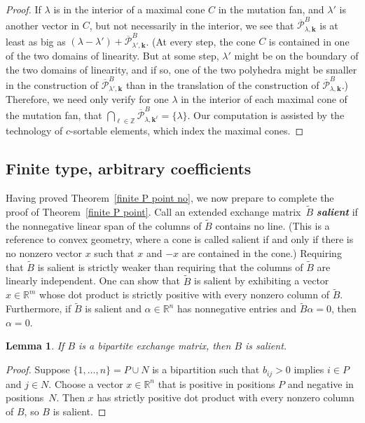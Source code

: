 \documentclass[10pt]{article}
\newtheorem{lemma}[proposition]{Lemma}
\theoremstyle{definition}
\theoremstyle{remark}
\numberwithin{equation}{section}
\newcommand{\newword}[1]{\textbf{\emph{#1}}}
\newcommand{\integers}{\mathbb Z}
\newcommand{\reals}{\mathbb R}
\newcommand{\set}[1]{{\lbrace #1 \rbrace}}
\newcommand{\0}{{\mathbf{0}}}
\newcommand{\kk}{{\boldsymbol{k}}}
\newcommand{\tB}{{\widetilde{B}}}
\renewcommand{\P}{\mathcal{P}}
\begin{document}
\begin{proof}
If $\lambda$ is in the interior of a maximal cone $C$ in the mutation fan, and $\lambda'$ is another vector in $C$, but not necessarily in the interior, we see that $\overline{\P}^B_{\lambda,\kk}$ is at least as big as $(\lambda-\lambda')+\overline{\P}^B_{\lambda',\kk}$.
(At every step, the cone $C$ is contained in one of the two domains of linearity.
But at some step, $\lambda'$ might be on the boundary of the two domains of linearity, and if so, one of the two polyhedra might be smaller in the construction of $\overline{\P}^B_{\lambda',\kk}$ than in the translation of the construction of $\overline{\P}^B_{\lambda,\kk}$.)
Therefore, we need only verify for one $\lambda$ in the interior of each maximal cone of the mutation fan, that $\bigcap_{\ell\in\integers}\overline{\P}^B_{\lambda,\kk^\ell}=\set{\lambda}$.
Our computation is assisted by the technology of $c$-sortable elements, which index the maximal cones.
\end{proof}

\subsection{Finite type, arbitrary coefficients}
Having proved Theorem~\ref{finite P point no}, we now prepare to complete the proof of Theorem~\ref{finite P point}.
Call an extended exchange matrix~$\tB$ \newword{salient} if the nonnegative linear span of the columns of $\tB$ contains no line.
(This is a reference to convex geometry, where a cone is called salient if and only if there is no nonzero vector $x$ such that $x$ and $-x$ are contained in the cone.)
Requiring that $\tB$ is salient is strictly weaker than requiring that the columns of $\tB$ are linearly independent.
One can show that $\tB$ is salient by exhibiting a vector $x\in\reals^m$ whose dot product is strictly positive with every nonzero column of $\tB$.
Furthermore, if $\tB$ is salient and $\alpha\in\reals^n$ has nonnegative entries and $\tB\alpha=0$, then $\alpha=0$.

\begin{lemma}\label{bip sal}
If $B$ is a bipartite exchange matrix, then $B$ is salient.
\end{lemma}
\begin{proof}
Suppose $\set{1,\ldots,n}=P\cup N$ is a bipartition such that $b_{ij}>0$ implies $i\in P$ and $j\in N$.
Choose a vector $x\in\reals^n$ that is positive in positions $P$ and negative in positions~$N$.
Then $x$ has strictly positive dot product with every nonzero column of $B$, so $B$ is salient.
\end{proof}
\end{document}
